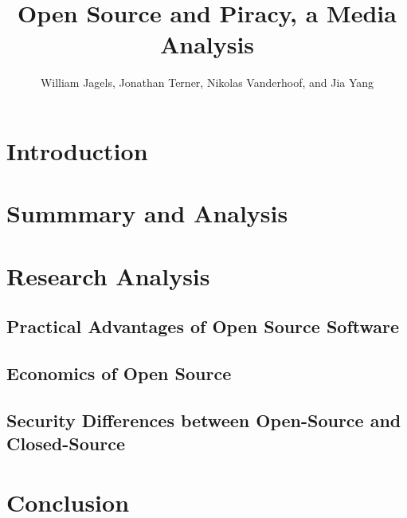 \documentclass[12pt,babel,english,man,natbib,apacite]{apa6}
\title{Open Source and Piracy, a Media Analysis}
\author{William Jagels, Jonathan Terner, Nikolas Vanderhoof, and Jia Yang}
\affiliation{Binghamton University}
\begin{document}
\maketitle
\section{Introduction}
\section{Summmary and Analysis}

\section{Research Analysis}
\subsection{Practical Advantages of Open Source Software}

\subsection{Economics of Open Source}

\subsection{Security Differences between Open-Source and Closed-Source}

\section{Conclusion}
\nocite{*}


\end{document}
